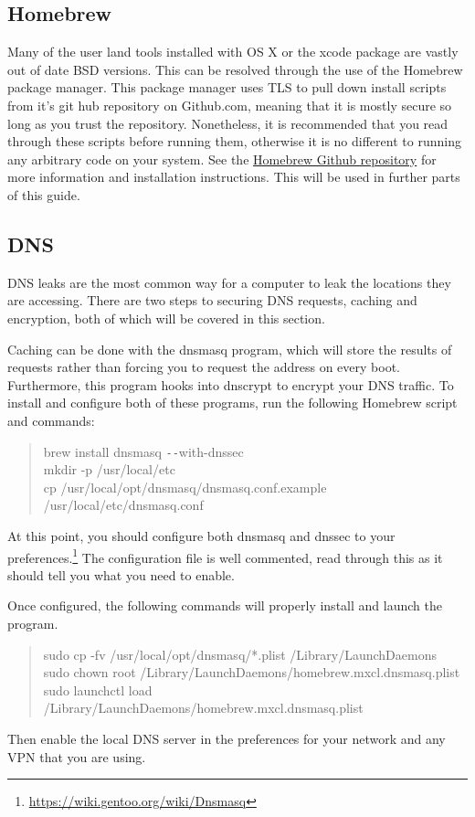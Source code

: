 \documentclass[a4paper,11pt]{report}
\begin{document}
			\subsection{Homebrew}
				Many of the user land tools installed with OS X or the xcode package are vastly out of date BSD versions. 
				This can be resolved through the use of the Homebrew package manager. 
				This package manager uses TLS to pull down install scripts from it's git hub repository on Github.com, meaning that it is mostly secure so long as you trust the repository. 
				Nonetheless, it is recommended that you read through these scripts before running them, otherwise it is no different to running any arbitrary code on your system. 
				See the \href{https://github.com/Homebrew/homebrew}{Homebrew Github repository} for more information and installation instructions. 
				This will be used in further parts of this guide.
			\subsection{DNS}
				DNS leaks are the most common way for a computer to leak the locations they are accessing. 
				There are two steps to securing DNS requests, caching and encryption, both of which will be covered in this section. 

				Caching can be done with the dnsmasq program, which will store the results of requests rather than forcing you to request the address on every boot. 
				Furthermore, this program hooks into dnscrypt to encrypt your DNS traffic. 
				To install and configure both of these programs, run the following Homebrew script and commands:
				\begin{quote}
					brew install dnsmasq \verb+--+with-dnssec \\
					mkdir -p /usr/local/etc \\
					cp /usr/local/opt/dnsmasq/dnsmasq.conf.example /usr/local/etc/dnsmasq.conf \\ %
				\end{quote}
				At this point, you should configure both dnsmasq and dnssec to your preferences.\footnote{\url{https://wiki.gentoo.org/wiki/Dnsmasq}}	
				The configuration file is well commented, read through this as it should tell you what you need to enable. 

				Once configured, the following commands will properly install and launch the program. 
				\begin{quote}
					sudo cp -fv /usr/local/opt/dnsmasq/*.plist /Library/LaunchDaemons \\
					sudo chown root /Library/LaunchDaemons/homebrew.mxcl.dnsmasq.plist \\
					sudo launchctl load /Library/LaunchDaemons/homebrew.mxcl.dnsmasq.plist \\
				\end{quote}
				Then enable the local DNS server in the preferences for your network and any VPN that you are using. 
\end{document}

